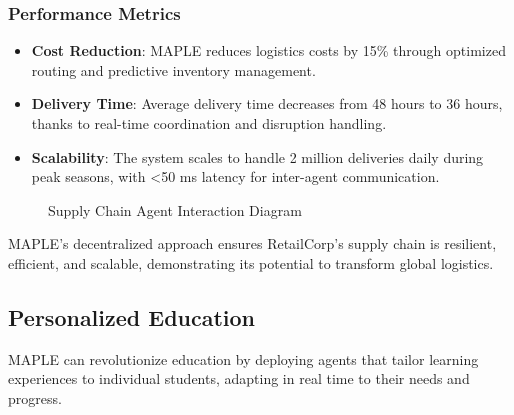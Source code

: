 \documentclass[a4paper,11pt]{article}
\begin{document}
\subsubsection{Performance Metrics}
\begin{itemize}[leftmargin=*]
    \item \textbf{Cost Reduction}: MAPLE reduces logistics costs by 15\% through optimized routing and predictive inventory management.
    \item \textbf{Delivery Time}: Average delivery time decreases from 48 hours to 36 hours, thanks to real-time coordination and disruption handling.
    \item \textbf{Scalability}: The system scales to handle 2 million deliveries daily during peak seasons, with <50 ms latency for inter-agent communication.
\end{itemize}

\begin{figure}[!ht]
\centering
{}
\caption{Supply Chain Agent Interaction Diagram}
\label{fig:supply-chain}
\end{figure}
\vspace{0.5cm}

MAPLE’s decentralized approach ensures RetailCorp’s supply chain is resilient, efficient, and scalable, demonstrating its potential to transform global logistics.

\subsection{Personalized Education}
MAPLE can revolutionize education by deploying agents that tailor learning experiences to individual students, adapting in real time to their needs and progress.
\end{document}
